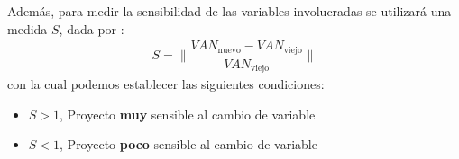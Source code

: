 \begin{enumerate}[(a)]
          Además, para medir la sensibilidad de las variables involucradas se utilizará
          una medida $S$, dada por :
          \begin{eqnarray}
              S = \|\dfrac{VAN_{\text{nuevo}} - VAN_{\text{viejo}}}{VAN_{\text{viejo}}}\|
          \end{eqnarray}
          con la cual podemos  establecer las siguientes condiciones:

          \begin{itemize}
              \item $S > 1$, Proyecto {\bf muy} sensible al cambio de variable
              \item $S < 1$, Proyecto {\bf poco} sensible al cambio de variable
          \end{itemize}


\end{enumerate}

